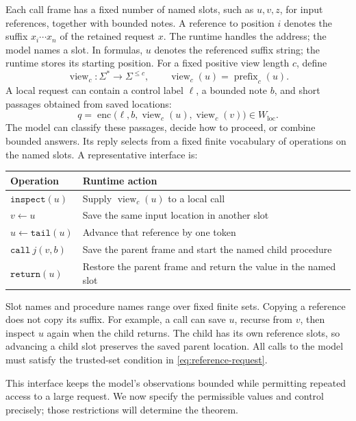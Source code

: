 \documentclass[11pt,twoside]{article}
\newcommand{\enc}{\operatorname{enc}}
\theoremstyle{definition}
\theoremstyle{remark}
\begin{document}
Each call frame has a fixed number of named slots, such as $u,v,z$, for
input references, together with bounded notes. A reference to position $i$
denotes the suffix $x_i\cdots x_n$ of the retained request $x$. The runtime
handles the address; the model names a slot. In formulas, $u$ denotes the
referenced suffix string; the runtime stores its starting position.
For a fixed positive view length $c$, define
\[
 \operatorname{view}_c:\Sigma^*\to\Sigma^{\leq c},\qquad
 \operatorname{view}_c(u)=\operatorname{prefix}_c(u).
\]
A local request can contain a control label $\ell$, a bounded note $b$,
and short passages obtained from saved locations:
\begin{equation}
 q=\enc\bigl(\ell,b,\operatorname{view}_c(u),
                    \operatorname{view}_c(v)\bigr)\in W_{\mathrm{loc}}.
 \label{eq:reference-request}
\end{equation}
The model can classify these passages, decide how to proceed, or combine
bounded answers. Its reply selects from a fixed finite vocabulary of
operations on the named slots. A representative interface is:
\begin{center}
\small
\renewcommand{\arraystretch}{1.15}
\begin{tabular}{p{}p{}}
\toprule
Operation & Runtime action \\
\midrule
$\mathtt{inspect}(u)$ & Supply $\operatorname{view}_c(u)$ to a local call \\
$v\leftarrow u$ & Save the same input location in another slot \\
$u\leftarrow\mathtt{tail}(u)$ & Advance that reference by one token \\
$\mathtt{call}\ j(v,b)$ & Save the parent frame and start the named child procedure \\
$\mathtt{return}(u)$ & Restore the parent frame and return the value in the named slot \\
\bottomrule
\end{tabular}
\end{center}
Slot names and procedure names range over fixed finite sets. Copying a
reference does not copy its suffix. For example, a call can save $u$,
recurse from $v$, then inspect $u$ again when the child returns. The child
has its own reference slots, so advancing a child slot preserves the saved
parent location. All calls to the model must satisfy the trusted-set
condition in \eqref{eq:reference-request}.

This interface keeps the model's observations bounded while permitting
repeated access to a large request. We now specify the permissible values
and control precisely; those restrictions will determine the theorem.
\end{document}
